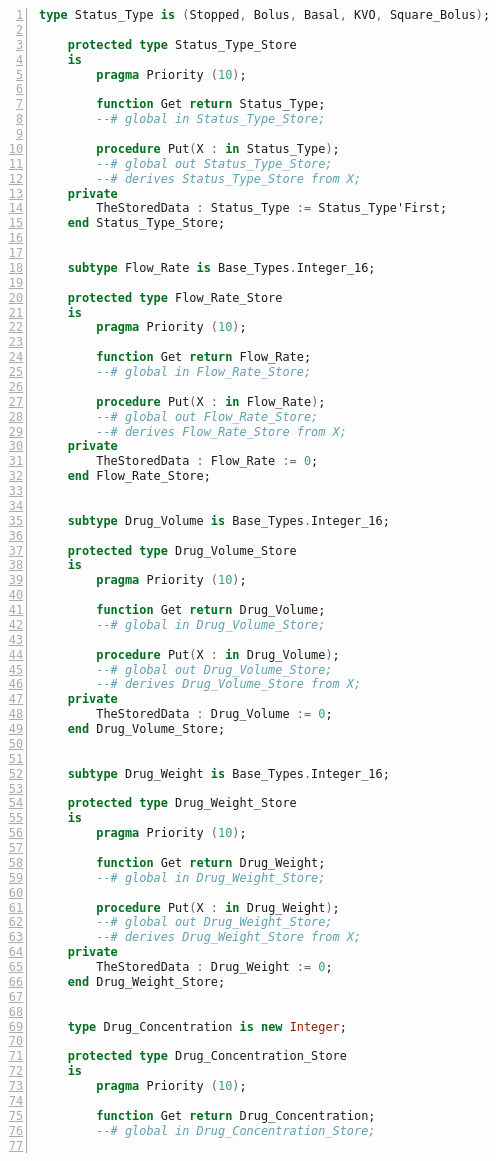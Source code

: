 \begin{lstlisting}[language=ada, gobble=0, numbers=left, caption={\lstinline{Pca_Types} package}]
    type Status_Type is (Stopped, Bolus, Basal, KVO, Square_Bolus);

    protected type Status_Type_Store
    is
        pragma Priority (10);

        function Get return Status_Type;
        --# global in Status_Type_Store;

        procedure Put(X : in Status_Type);
        --# global out Status_Type_Store;
        --# derives Status_Type_Store from X;
    private
        TheStoredData : Status_Type := Status_Type'First;
    end Status_Type_Store;


    subtype Flow_Rate is Base_Types.Integer_16;

    protected type Flow_Rate_Store
    is
        pragma Priority (10);

        function Get return Flow_Rate;
        --# global in Flow_Rate_Store;

        procedure Put(X : in Flow_Rate);
        --# global out Flow_Rate_Store;
        --# derives Flow_Rate_Store from X;
    private
        TheStoredData : Flow_Rate := 0;
    end Flow_Rate_Store;


    subtype Drug_Volume is Base_Types.Integer_16;

    protected type Drug_Volume_Store
    is
        pragma Priority (10);

        function Get return Drug_Volume;
        --# global in Drug_Volume_Store;

        procedure Put(X : in Drug_Volume);
        --# global out Drug_Volume_Store;
        --# derives Drug_Volume_Store from X;
    private
        TheStoredData : Drug_Volume := 0;
    end Drug_Volume_Store;


    subtype Drug_Weight is Base_Types.Integer_16;

    protected type Drug_Weight_Store
    is
        pragma Priority (10);

        function Get return Drug_Weight;
        --# global in Drug_Weight_Store;

        procedure Put(X : in Drug_Weight);
        --# global out Drug_Weight_Store;
        --# derives Drug_Weight_Store from X;
    private
        TheStoredData : Drug_Weight := 0;
    end Drug_Weight_Store;


    type Drug_Concentration is new Integer;

    protected type Drug_Concentration_Store
    is
        pragma Priority (10);

        function Get return Drug_Concentration;
        --# global in Drug_Concentration_Store;


\end{lstlisting}
